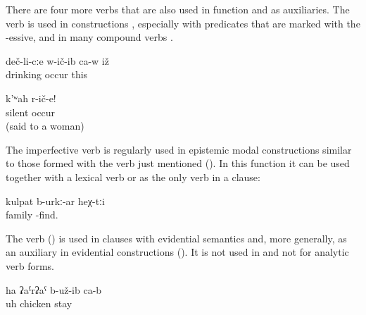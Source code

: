 There are four more verbs that are also used in  function and as auxiliaries. The verb   is used in  constructions , especially with predicates that are marked with the -essive, and in many compound verbs .

\begin{exe}
	\ex	\label{ex:He became a drinker}
	\gll	deč-li-cːe	w-ič-ib	ca-w	iž\\
		drinking	occur		this\\
	\glt	{}

	\ex	\label{ex:Be silent}
	\gll	k'ʷah	r-ič-e!\\
		silent	occur\\
	\glt	{} (said to a woman)
\end{exe}

The imperfective verb   is regularly used in epistemic modal constructions similar to those formed with the verb   just mentioned (). In this function it can be used together with a lexical verb or as the only verb in a  clause: 

\begin{exe}
	\ex	\label{They are probably a family.COP}
	\gll	kulpat	b-urkː-ar			heχ-tːi\\
		family	-find.	\\
	\glt	{}
\end{exe}

The verb  ()  is used in  clauses with evidential semantics  and, more generally, as an auxiliary in evidential constructions (). It is not used in  and not for analytic verb forms.

\begin{exe}
	\ex	\label{ex:Ah, it turned out to be a chicken}
	\gll	ha	ʡaˁrʡaˁ	b-už-ib	ca-b\\
		uh	chicken	stay	\\
	\glt	{}
\end{exe}

